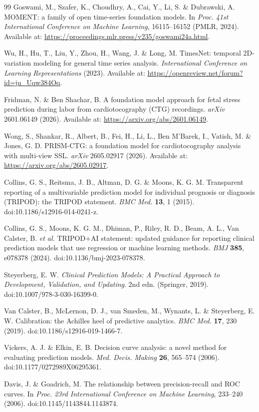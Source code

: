 \documentclass[pdflatex,sn-nature]{sn-jnl}
\begin{document}
\begin{thebibliography}{99}
Goswami, M., Szafer, K., Choudhry, A., Cai, Y., Li, S. \& Dubrawski, A.
MOMENT: a family of open time-series foundation models.
In \textit{Proc. 41st International Conference on Machine Learning}, 16115--16152 (PMLR, 2024).
Available at: \url{https://proceedings.mlr.press/v235/goswami24a.html}.

Wu, H., Hu, T., Liu, Y., Zhou, H., Wang, J. \& Long, M.
TimesNet: temporal 2D-variation modeling for general time series analysis.
\textit{International Conference on Learning Representations} (2023).
Available at: \url{https://openreview.net/forum?id=ju_Uqw384Oq}.

Fridman, N. \& Ben Shachar, B.
A foundation model approach for fetal stress prediction during labor from cardiotocography (CTG) recordings.
\textit{arXiv} 2601.06149 (2026).
Available at: \url{https://arxiv.org/abs/2601.06149}.

Wong, S., Shankar, R., Albert, B., Fei, H., Li, L., Ben M'Barek, I., Vatish, M. \& Jones, G. D.
PRISM-CTG: a foundation model for cardiotocography analysis with multi-view SSL.
\textit{arXiv} 2605.02917 (2026).
Available at: \url{https://arxiv.org/abs/2605.02917}.

Collins, G. S., Reitsma, J. B., Altman, D. G. \& Moons, K. G. M.
Transparent reporting of a multivariable prediction model for individual prognosis or diagnosis (TRIPOD): the TRIPOD statement.
\textit{BMC Med.} \textbf{13}, 1 (2015).
doi:10.1186/s12916-014-0241-z.

Collins, G. S., Moons, K. G. M., Dhiman, P., Riley, R. D., Beam, A. L., Van Calster, B. \textit{et al.}
TRIPOD+AI statement: updated guidance for reporting clinical prediction models that use regression or machine learning methods.
\textit{BMJ} \textbf{385}, e078378 (2024).
doi:10.1136/bmj-2023-078378.

Steyerberg, E. W.
\textit{Clinical Prediction Models: A Practical Approach to Development, Validation, and Updating}.
2nd edn. (Springer, 2019).
doi:10.1007/978-3-030-16399-0.

Van Calster, B., McLernon, D. J., van Smeden, M., Wynants, L. \& Steyerberg, E. W.
Calibration: the Achilles heel of predictive analytics.
\textit{BMC Med.} \textbf{17}, 230 (2019).
doi:10.1186/s12916-019-1466-7.

Vickers, A. J. \& Elkin, E. B.
Decision curve analysis: a novel method for evaluating prediction models.
\textit{Med. Decis. Making} \textbf{26}, 565--574 (2006).
doi:10.1177/0272989X06295361.

Davis, J. \& Goadrich, M.
The relationship between precision-recall and ROC curves.
In \textit{Proc. 23rd International Conference on Machine Learning}, 233--240 (2006).
doi:10.1145/1143844.1143874.

\end{thebibliography}
\end{document}

